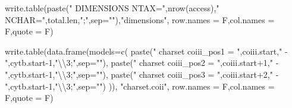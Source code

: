 \documentclass[
]{article}
\newenvironment{Shaded}{\begin{snugshade}}{\end{snugshade}}
\newcommand{\AttributeTok}[1]{\textcolor[rgb]{0.77,0.63,0.00}{#1}}
\newcommand{\DecValTok}[1]{\textcolor[rgb]{0.00,0.00,0.81}{#1}}
\newcommand{\FunctionTok}[1]{\textcolor[rgb]{0.00,0.00,0.00}{#1}}
\newcommand{\NormalTok}[1]{#1}
\newcommand{\SpecialCharTok}[1]{\textcolor[rgb]{0.00,0.00,0.00}{#1}}
\newcommand{\StringTok}[1]{\textcolor[rgb]{0.31,0.60,0.02}{#1}}
\begin{document}
\begin{Shaded}
\begin{Highlighting}[]
\FunctionTok{write.table}\NormalTok{(}\FunctionTok{paste}\NormalTok{(}\StringTok{"  DIMENSIONS NTAX="}\NormalTok{,}\FunctionTok{nrow}\NormalTok{(access),}\StringTok{" NCHAR="}\NormalTok{,total.len,}\StringTok{";"}\NormalTok{,}\AttributeTok{sep=}\StringTok{""}\NormalTok{),}\StringTok{"dimensions"}\NormalTok{,}
            \AttributeTok{row.names =}\NormalTok{ F,}\AttributeTok{col.names =}\NormalTok{ F,}\AttributeTok{quote =}\NormalTok{ F)}

\FunctionTok{write.table}\NormalTok{(}\FunctionTok{data.frame}\NormalTok{(}\AttributeTok{models=}\FunctionTok{c}\NormalTok{(}
            \FunctionTok{paste}\NormalTok{(}\StringTok{"      charset coiii\_pos1 =  "}\NormalTok{,coiii.start,}\StringTok{" {-} "}\NormalTok{,cytb.start}\DecValTok{{-}1}\NormalTok{,}\StringTok{"}\SpecialCharTok{\textbackslash{}\textbackslash{}}\StringTok{3;"}\NormalTok{,}\AttributeTok{sep=}\StringTok{""}\NormalTok{),}
            \FunctionTok{paste}\NormalTok{(}\StringTok{"      charset coiii\_pos2 =  "}\NormalTok{,coiii.start}\SpecialCharTok{+}\DecValTok{1}\NormalTok{,}\StringTok{" {-} "}\NormalTok{,cytb.start}\DecValTok{{-}1}\NormalTok{,}\StringTok{"}\SpecialCharTok{\textbackslash{}\textbackslash{}}\StringTok{3;"}\NormalTok{,}\AttributeTok{sep=}\StringTok{""}\NormalTok{),}
            \FunctionTok{paste}\NormalTok{(}\StringTok{"      charset coiii\_pos3 =  "}\NormalTok{,coiii.start}\SpecialCharTok{+}\DecValTok{2}\NormalTok{,}\StringTok{" {-} "}\NormalTok{,cytb.start}\DecValTok{{-}1}\NormalTok{,}\StringTok{"}\SpecialCharTok{\textbackslash{}\textbackslash{}}\StringTok{3;"}\NormalTok{,}\AttributeTok{sep=}\StringTok{""}\NormalTok{)}
\NormalTok{            )),}
            \StringTok{"charset.coii"}\NormalTok{,}
            \AttributeTok{row.names =}\NormalTok{ F,}\AttributeTok{col.names =}\NormalTok{ F,}\AttributeTok{quote =}\NormalTok{ F)}


\end{Highlighting}
\end{Shaded}
\end{document}
